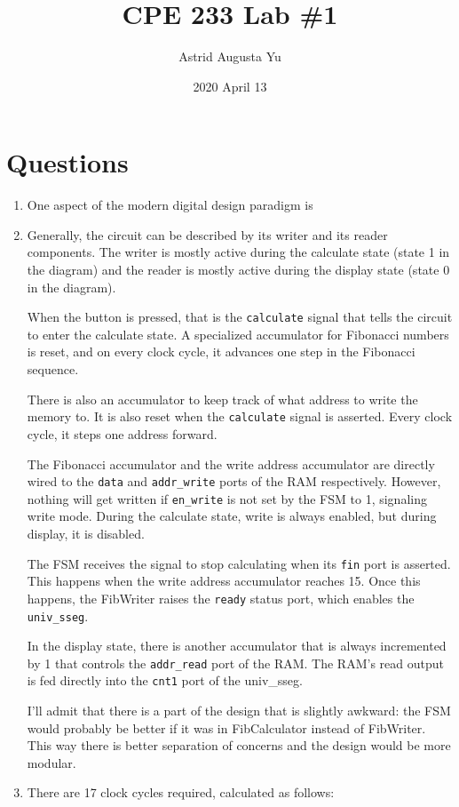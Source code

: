 \documentclass{article}
\author{Astrid Augusta Yu}
\title{CPE 233 Lab \#1}
\date{2020 April 13}
\begin{document}
\maketitle

\section{Questions}
\begin{enumerate}
    \item One aspect of the modern digital design paradigm is 
    \item{
        Generally, the circuit can be described by its writer and its reader components. The writer is mostly active during the 
        calculate state (state 1 in the diagram) and the reader is mostly active during the display state (state 0 in the diagram).

        When the button is pressed, that is the \texttt{calculate} signal that tells the circuit to enter the calculate state.
        A specialized accumulator for Fibonacci numbers is reset, and on every clock cycle, it advances one step in the 
        Fibonacci sequence. 

        There is also an accumulator to keep track of what address to write the memory to. It is also reset when the 
        \texttt{calculate} signal is asserted. Every clock cycle, it steps one address forward.

        The Fibonacci accumulator and the write address accumulator are directly wired to the \texttt{data} and 
        \texttt{addr\_write} ports of the RAM respectively. However, nothing will get written if \texttt{en\_write} is not set
        by the FSM to 1, signaling write mode. During the calculate state, write is always enabled, but during display, it is disabled.
        
        The FSM receives the signal to stop calculating when its \texttt{fin} port is asserted. This happens when the 
        write address accumulator reaches 15. Once this happens, the FibWriter raises the \texttt{ready} status port,
        which enables the \texttt{univ\_sseg}.

        In the display state, there is another accumulator that is always incremented by 1 that controls the \texttt{addr\_read}
        port of the RAM. The RAM's read output is fed directly into the \texttt{cnt1} port of the univ\_sseg.

        I'll admit that there is a part of the design that is slightly awkward: the FSM would probably be better if it was in FibCalculator
        instead of FibWriter. This way there is better separation of concerns and the design would be more modular.
    }
    \item{ 
        There are 17 clock cycles required, calculated as follows:

}
\end{enumerate}
\end{document}
